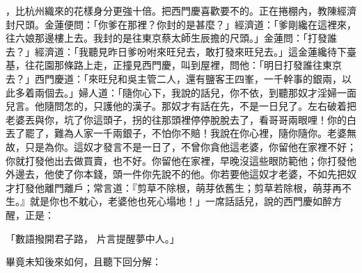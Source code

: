 \begin{showcontents}{}
，比杭州織來的花樣身分更強十倍。把西門慶喜歡要不的。正在捲棚內，教陳經濟封尺頭。金蓮便問：「你爹在那裡？你封的是甚麼？」經濟道：「爹剛纔在這裡來，往六娘那邊樓上去。我封的是往東京蔡太師生辰擔的尺頭。」金蓮問：「打發誰去？」經濟道：「我聽見昨日爹吩咐來旺兒去，敢打發來旺兒去。」這金蓮纔待下臺基，往花園那條路上走，正撞見西門慶，叫到屋裡，問他：「明日打發誰往東京去？」西門慶道：「來旺兒和吳主管二人，還有鹽客王四峯，一千幹事的銀兩，以此多着兩個去。」婦人道：「隨你心下，我說的話兒，你不依，到聽那奴才淫婦一面兒言。他隨問怎的，只護他的漢子。那奴才有話在先，不是一日兒了。左右破着把老婆丟與你，坑了你這頭子，拐的往那頭裡停停脫脫去了，看哥哥兩眼哩！你的白丟了罷了，難為人家一千兩銀子，不怕你不賠！我說在你心裡，隨你隨你。老婆無故，只是為你。這奴才發言不是一日了，不曾你貪他這老婆，你留他在家裡不好；你就打發他出去做買賣，也不好。你留他在家裡，早晚沒這些眼防範他；你打發他外邊去，他使了你本錢，頭一件你先說不的他。你若要他這奴才老婆，不如先把奴才打發他離門離戶；常言道：『剪草不除根，萌芽依舊生；剪草若除根，萌芽再不生。』就是你也不躭心，老婆他也死心塌地！」一席話話兒，說的西門慶如醉方醒，正是：

「數語撥開君子路，  片言提醒夢中人。」

畢竟未知後來如何，且聽下回分解：





\end{showcontents}


